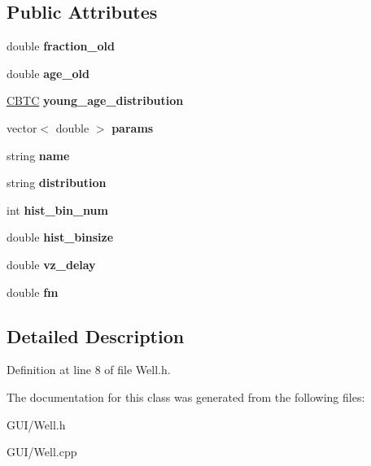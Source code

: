\subsection*{Public Attributes}
\begin{DoxyCompactItemize}
\item 
\mbox{\label{class_c_well_a54e80ef6380e9da3ab16f1c2168aca39}} 
double {\bfseries fraction\+\_\+old}
\item 
\mbox{\label{class_c_well_aac17e1953483418c9bf9a4283f2f8f70}} 
double {\bfseries age\+\_\+old}
\item 
\mbox{\label{class_c_well_a865e96f666eb6ce402107a6f16f42fe1}} 
\hyperlink{class_c_b_t_c}{C\+B\+TC} {\bfseries young\+\_\+age\+\_\+distribution}
\item 
\mbox{\label{class_c_well_a767a76b3f7269b104482bcc65823658c}} 
vector$<$ double $>$ {\bfseries params}
\item 
\mbox{\label{class_c_well_ac324d50dbe4ed6cb732218780d1f80f6}} 
string {\bfseries name}
\item 
\mbox{\label{class_c_well_a382765f71d3ac440fc7ee724d1cc6115}} 
string {\bfseries distribution}
\item 
\mbox{\label{class_c_well_aa124d26f706d52e6dcb44c0389845a86}} 
int {\bfseries hist\+\_\+bin\+\_\+num}
\item 
\mbox{\label{class_c_well_ab3f69e0c6bb367642c6fdd465427023d}} 
double {\bfseries hist\+\_\+binsize}
\item 
\mbox{\label{class_c_well_adf52a611875db237e8708f01871a07b5}} 
double {\bfseries vz\+\_\+delay}
\item 
\mbox{\label{class_c_well_a7a9b9689c99a0b1302973f81830ee7f5}} 
double {\bfseries fm}
\end{DoxyCompactItemize}


\subsection{Detailed Description}


Definition at line 8 of file Well.\+h.



The documentation for this class was generated from the following files\+:\begin{DoxyCompactItemize}
\item 
G\+U\+I/Well.\+h\item 
G\+U\+I/Well.\+cpp\end{DoxyCompactItemize}
